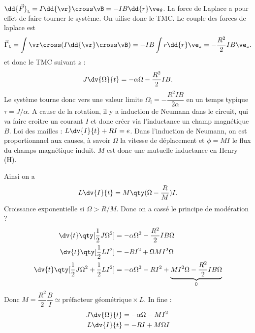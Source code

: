 \begin{solution}
    \begin{questions}
        \question $\dd{\vec{F}}_\textsc{l} = I\dd{\vr}\cross\vB = -I B \dd{r}\ve_\theta$. La force de Laplace a pour effet de faire tourner le système.
        \question On uilise donc le TMC. Le couple des forces de laplace est
        $$\vec{\Gamma}_\textsc{l} = \int\vr\cross(I\dd{\vr}\cross\vB) = -I B \int r\dd{r} \ve_z = -\dfrac{R^2}{2} I B \ve_z.$$
        et donc le TMC suivant $z$ :
        $$J\dv{\Omega}{t} = -\alpha\Omega - \dfrac{R^2}{2} I B.$$
        Le système tourne donc vers une valeur limite $\Omega_\text{l} = -\dfrac{R^2 I B}{2\alpha}$ en un temps typique $\tau = J/\alpha$.
        \question A cause de la rotation, il y a induction de Neumann dans le circuit, qui va faire croitre un courant $I$ et donc créer via l'inductance un champ magnétique $B$.
        \question Loi des mailles : $L\dv{I}{t} + R I = e$.
        \question Dans l'induction de Neumann, on est proportionnnel aux causes, à savoir $\Omega$ la vitesse de déplacement et $\phi = MI$ le flux du champs magnétique induit. $M$ est donc une mutuelle inductance en Henry (H).

        Ainsi on  a
        $$L\dv{I}{t} =  M\qty(\Omega - \dfrac{R}{M})I.$$
        Croissance exponentielle si $\Omega > R/M$. Donc  on a cassé le principe de modération ?
        \question \begin{align*}
            \dv{t} \qty[\dfrac{1}{2}J\Omega^2] &= -\alpha\Omega^2 - \dfrac{R^2}{2} I B \Omega \\
            \dv{t} \qty[\dfrac{1}{2}L I^2] &= -R I^2 + \Omega M I^2 \Omega \\
            \dv{t} \qty[\dfrac{1}{2}J\Omega^2 + \dfrac{1}{2}L I^2] &= -\alpha\Omega^2 -R I^2 + \underset{0}{\underbrace{M I^2 \Omega - \dfrac{R^2}{2} I B \Omega}} \\
        \end{align*}
        \question Donc $M = \dfrac{R^2}{2}\dfrac{B}{I} \simeq \text{préfacteur géométrique} \times L$.
        In fine :
        \begin{align*}
            J\dv{\Omega}{t} &= -\alpha\Omega - M I^2 \\
            L\dv{I}{t} &=  - RI + M\Omega I            
        \end{align*}
    \end{questions}
\end{solution}